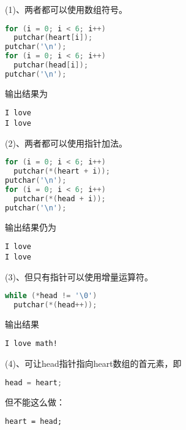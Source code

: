 \begin{frame}[fragile]
(1)、两者都可以使用数组符号。
\begin{lstlisting}[language=c,showstringspaces=true]
for (i = 0; i < 6; i++)
  putchar(heart[i]);
putchar('\n');
for (i = 0; i < 6; i++)
  putchar(head[i]);
putchar('\n');
\end{lstlisting}
\vspace{0.1in}

输出结果为
\begin{lstlisting}[basicstyle=\ttfamily,showstringspaces=true]
I love
I love
\end{lstlisting}
\end{frame}

\begin{frame}[fragile]
(2)、两者都可以使用指针加法。
\begin{lstlisting}[language=c,showstringspaces=true]
for (i = 0; i < 6; i++)
  putchar(*(heart + i));
putchar('\n');
for (i = 0; i < 6; i++)
  putchar(*(head + i));
putchar('\n');
\end{lstlisting}
\vspace{0.1in}

输出结果仍为
\begin{lstlisting}[basicstyle=\ttfamily,showstringspaces=true]
I love
I love
\end{lstlisting}
\end{frame}

\begin{frame}[fragile]
(3)、但只有指针可以使用增量运算符。
\begin{lstlisting}[language=c,showstringspaces=true]
while (*head != '\0')
  putchar(*(head++));
\end{lstlisting}
\vspace{0.1in}

输出结果
\begin{lstlisting}[basicstyle=\ttfamily,showstringspaces=true]
I love math!
\end{lstlisting}
\end{frame}

\begin{frame}[fragile]
(4)、可让head指针指向heart数组的首元素，即
\begin{lstlisting}[language=c,showstringspaces=true]
head = heart;
\end{lstlisting}
\vspace{0.05in}

但不能这么做：
\begin{lstlisting}[basicstyle=\ttfamily,showstringspaces=true]
heart = head;
\end{lstlisting}
\end{frame}

